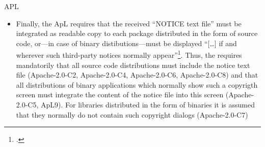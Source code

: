 \begin{license}{APL}
\begin{itemize}
  \item Finally, the ApL requires that the received ``NOTICE text file'' must be
  integrated as readable copy to each package distributed in the form of source
  code, or---in case of binary distibutions---must be displayed
  \enquote{[\ldots] if and wherever such third-party notices normally
  appear}\footcite[cf.][\nopage wp.\ §4.4]{Apl20OsiLicense2004a}. Thus, the \oslic{}
  requires mandatorily that all source code distributions must include the
  notice text file (Apache-2.0-C2, Apache-2.0-C4, Apache-2.0-C6, Apache-2.0-C8) and that all distributions of
  binary applications which normally show such a copyrigth screen must integrate
  the content of the notice file into this screen (Apache-2.0-C5, ApL9). For libraries
  distributed in the form of binaries it is assumed that they normally do not
  contain such copyright dialogs (Apache-2.0-C7)
\end{itemize}

\end{license}

%

